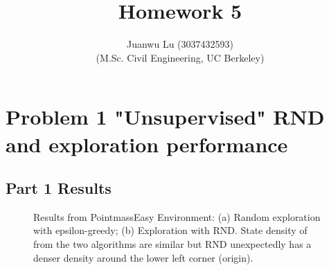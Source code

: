 \documentclass[10pt, letterpaper]{article}
\title{%
    \textbf{Homework 5}
}
\author{Juanwu Lu (3037432593)\\ \small(M.Sc. Civil Engineering, UC Berkeley)}
\date{}
\begin{document}
\maketitle
{}
\thispagestyle{fancy}
\pagestyle{plain}

\section*{Problem 1 "Unsupervised" RND and exploration performance}
\subsection*{Part 1 Results}

\begin{figure}[h!]
    \centering
    \caption{Results from PointmassEasy Environment: (a) Random exploration with epsilon-greedy; (b) Exploration with RND. State density of from the two algorithms are similar but RND unexpectedly has a denser density around the lower left corner (origin).}
    \label{fig:1}
\end{figure}
\end{document}
